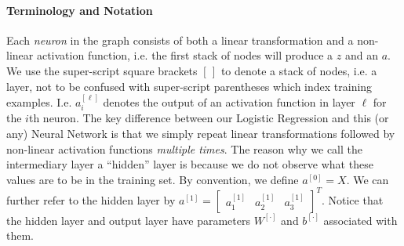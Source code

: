 \documentclass[12pt]{article}
\begin{document}
\paragraph{Terminology and Notation}
Each \emph{neuron} in the graph consists of both a linear transformation and a non-linear activation function, i.e. the first stack of nodes will produce a $z$ and an $a$. We use the super-script square brackets $[\hspace{2pt} ]$ to denote a stack of nodes, i.e. a layer, not to be confused with super-script parentheses which index training examples. I.e. $a^{[\ell]}_i$ denotes the output of an activation function in layer $\ell$ for the $i$th neuron.
The key difference between our Logistic Regression and 
this (or any) Neural Network is that we simply repeat linear transformations followed by non-linear activation functions \emph{multiple times}.
The reason why we call the intermediary layer a ``hidden'' layer is because we do not observe what these values are to be in the training set. By convention, we define  $a^{[0]} = X$. We can further refer to the hidden layer by ${a^{[1]}} = \begin{bmatrix}   a_1^{[1]} & a_2^{[1]} & a_3^{[1]}  \end{bmatrix}^T$. Notice that the hidden layer and output layer have parameters $W^{[\cdot]}$ and $b^{[\cdot]}$ associated with them. 
\end{document}

